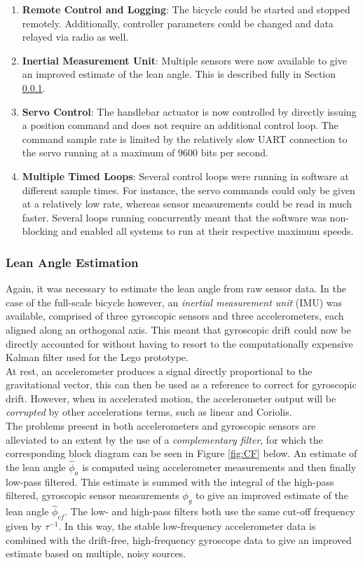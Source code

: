 \begin{enumerate}
\item{\textbf{Remote Control and Logging}: The bicycle could be started and stopped remotely. Additionally, controller parameters could be changed and data relayed via radio as well.}
\item{\textbf{Inertial Measurement Unit}: Multiple sensors were now available to give an improved estimate of the lean angle. This is described fully in Section \ref{leanangleestimatefs}.}
\item{\textbf{Servo Control}: The handlebar actuator is now controlled by directly issuing a position command and does not require an additional control loop. The command sample rate is limited by the relatively slow UART connection to the servo running at a maximum of $9600$ bits per second.}
\item{\textbf{Multiple Timed Loops}: Several control loops were running in software at different sample times. For instance, the servo commands could only be given at a relatively low rate, whereas sensor measurements could be read in much faster. Several loops running concurrently meant that the software was non-blocking and enabled all systems to run at their respective maximum speeds.}
\end{enumerate}

\subsubsection{Lean Angle Estimation} \label{leanangleestimatefs}
Again, it was necessary to estimate the lean angle from raw sensor data. In the case of the full-scale bicycle however, an \textit{inertial measurement unit} (IMU) was available, comprised of three gyroscopic sensors and three accelerometers, each aligned along an orthogonal axis. This meant that gyroscopic drift could now be directly accounted for without having to resort to the computationally expensive Kalman filter used for the Lego prototype.\\

At rest, an accelerometer produces a signal directly proportional to the gravitational vector, this can then be used as a reference to correct for gyroscopic drift. However, when in accelerated motion, the accelerometer output will be \textit{corrupted} by other accelerations terms, such as linear and Coriolis. \\

The problems present in both accelerometers and gyroscopic sensors are alleviated to an extent by the use of a \textit{complementary filter}, for which the corresponding block diagram can be seen in Figure \ref{fig:CF} below. An estimate of the lean angle $\hat{\phi}_a$ is computed using accelerometer measurements and then finally low-pass filtered. This estimate is summed with the integral of the high-pass filtered, gyroscopic sensor measurements $\dot{\phi}_g$ to give an improved estimate of the lean angle $\hat{\phi}_{cf}$. The low- and high-pass filters both use the same cut-off frequency given by $\tau^{-1}$. In this way, the stable low-frequency accelerometer data is combined with the drift-free, high-frequency gyroscope data to give an improved estimate based on multiple, noisy sources.

